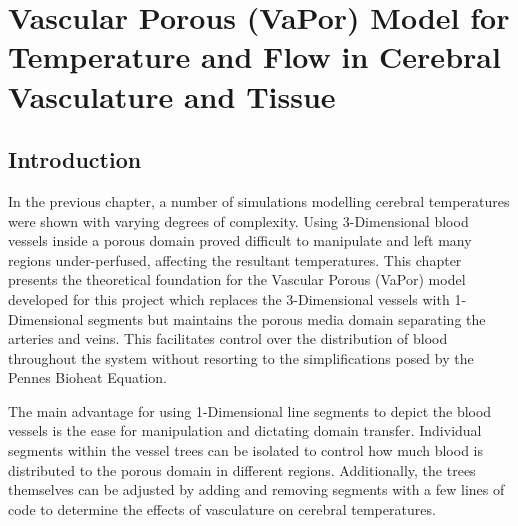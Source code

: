 \documentclass[11pt,english,a4paper,twoside,openright]{report}
\begin{document}
{{{{{{{{\newpage
\thispagestyle{empty}
\chapter[Vascular Porous (VaPor) Model for Temperature and Flow in Cerebral Vasculature and Tissue]{{\Huge V}ascular {\Huge P}orous ({\Huge V}a{\Huge P}or) {\Huge M}odel for {\Huge T}emperature and {\Huge F}low in {\Huge C}erebral {\Huge V}asculature and {\Huge T}issue}
\thispagestyle{empty}
\label{Sec:3Chapter3}

\section[Introduction]{{\Large I}ntroduction}

In the previous chapter, a number of simulations modelling cerebral temperatures were shown with varying degrees of complexity. Using 3-Dimensional blood vessels inside a porous domain proved difficult to manipulate and left many regions under-perfused, affecting the resultant temperatures. This chapter presents the theoretical foundation for the Vascular Porous (VaPor) model developed for this project which replaces the 3-Dimensional vessels with 1-Dimensional segments but maintains the porous media domain separating the arteries and veins. This facilitates control over the distribution of blood throughout the system without resorting to the simplifications posed by the Pennes Bioheat Equation.

The main advantage for using 1-Dimensional line segments to depict the blood vessels is the ease for manipulation and dictating domain transfer. Individual segments within the vessel trees can be isolated to control how much blood is distributed to the porous domain in different regions. Additionally, the trees themselves can be adjusted by adding and removing segments with a few lines of code to determine the effects of vasculature on cerebral temperatures. 

}}}}}}}}
\end{document}
